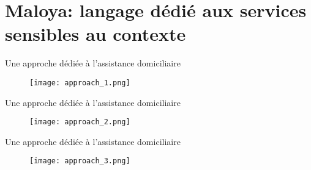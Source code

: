 \section{Maloya: langage dédié aux services sensibles au contexte}


\begin{frame}{Une approche dédiée à l'assistance domiciliaire}
\begin{figure}
  \texttt{[image: approach\_1.png]}
\end{figure}
\end{frame}
\begin{frame}{Une approche dédiée à l'assistance domiciliaire}
\addtocounter{framenumber}{-1}
\begin{figure}
  \texttt{[image: approach\_2.png]}
\end{figure}
\end{frame}
\begin{frame}{Une approche dédiée à l'assistance domiciliaire}
\addtocounter{framenumber}{-1}
\begin{figure}
  \texttt{[image: approach\_3.png]}
\end{figure}
\end{frame}

